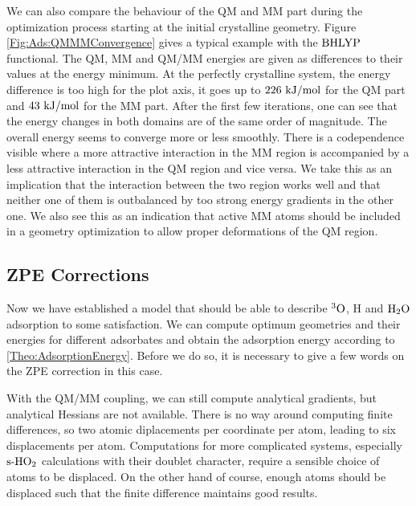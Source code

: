 We can also compare the behaviour of the QM and MM part during the optimization
process starting at the initial crystalline geometry. Figure \ref{Fig:Ads:QMMMConvergence}
gives a typical example with the $\text{BHLYP}$ functional. The QM, MM and
QM/MM energies are given as differences to their values at the energy minimum.
At the perfectly crystalline system, the energy difference is too high for the
plot axis, it goes up to $226~\text {kJ/mol}$ for the QM part and $43~\text {kJ/mol}$ for the MM part. 
After the first few iterations, one can see
that the energy changes in both domains are of the same order of magnitude. The
overall energy seems to converge more or less smoothly. There is a codependence
visible where a more attractive interaction in the MM region is accompanied by
a less attractive interaction in the QM region and vice versa. We take this as
an implication that the interaction between the two region works well and that
neither one of them is outbalanced by too strong energy gradients in the other
one. We also see this as an indication that active MM atoms should be included
in a geometry optimization to allow proper deformations of the QM region.

\subsection{ZPE Corrections}
\label{Sec:Ads:ZPE}

Now we have established a model that should be able to describe ${^3\text{O}}$, 
H and $\text H _2 \text O$ adsorption to some satisfaction. We can compute optimum geometries
and their energies for different adsorbates and obtain the adsorption energy
according to \eqref{Theo:AdsorptionEnergy}. Before we do so, it is necessary
to give a few words on the ZPE correction in this case.

With the QM/MM coupling, we can still compute analytical
gradients,\cite{VersluisZiegler1988} but analytical Hessians are
not available. There is no way around computing finite differences, so
two atomic diplacements per coordinate per atom, leading to six displacements
per atom. Computations for more complicated systems, especially $\text{s-}\text H \text O_2$
calculations with their doublet character, require a sensible choice of atoms
to be displaced. On the other hand of course, enough atoms should be displaced
such that the finite difference maintains good results.

